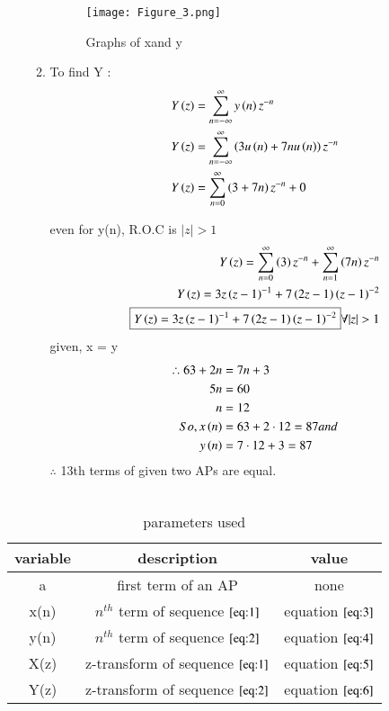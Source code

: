 \documentclass[journal,12pt,twocolumn]{IEEEtran}
\theoremstyle{remark}
\begin{document}
\begin{enumerate}
\begin{enumerate}
\begin{figure}[ht]
    \texttt{[image: Figure\_3.png]}
    \caption{Graphs of xand y}
    \label{Fig:1}
\end{figure}
\item
To find Y :\\
\begin{align}
Y\left(z\right) &= \sum_{n=-\infty}^{\infty} y\left(n\right)z^{-n}\\
Y\left(z\right) &= \sum_{n=-\infty}^{\infty} \left(3u\left(n\right) + 7nu\left(n\right)\right)z^{-n}\\
Y\left(z\right) &= \sum_{n=0}^{\infty} \left(3 + 7n\right)z^{-n} + 0
\end{align}

even for y(n), R.O.C is $ |z|>1$\\
\begin{align}
Y\brak{z} = \sum_{n=0}^{\infty} \brak{3}z^{-n}+\sum_{n=1}^{\infty}\brak{7n}z^{-n}\\
Y\brak{z} = 3z\brak{z-1}^{-1} + 7\brak{2z-1}\brak{z-1}^{-2}\\
\boxed{Y\brak{z} = 3z\brak{z-1}^{-1} + 7\brak{2z-1}\brak{z-1}^{-2}} \forall  |z|>1 \label{eq:6}
\end{align}
given, x = y\\
\begin{align}
\therefore 63 + 2n &= 7n+3\\
5n &= 60\\
n &= 12\\
So, x\left(n\right) &= 63 + 2\cdot12 = 87  and\\
y\left(n\right) &= 7\cdot12 + 3 = 87
\end{align}
$ \therefore$ 13th terms of given two APs are equal.\\\\
\end{enumerate}
\end{enumerate}
\begin{table}[ht]
    \centering
    \begin{tabular}{|c|c|c|}
    \hline
      variable&description&value\\\hline
         a&first term of an AP&none\\\hline
         x(n)& $ n^{th}$ term of sequence $ \eqref{eq:1}$&equation $ \eqref{eq:3}$\\\hline
         y(n)& $ n^{th}$ term of sequence $ \eqref{eq:2}$& equation $ \eqref{eq:4}$\\\hline
         X(z)& z-transform of sequence $ \eqref{eq:1}$& equation $ \eqref{eq:5}$\\\hline
         Y(z)& z-transform of sequence $ \eqref{eq:2}$& equation $ \eqref{eq:6}$\\\hline
    \end{tabular}
    \caption{parameters used}
    \label{tab:my_label}
\end{table}
\end{document}
